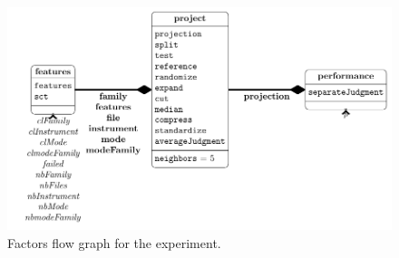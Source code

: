   
 
  
  
\begin{center} 
  
  
\begin{figure} 
  
  
\includegraphics[width=\textwidth,height=0.8\textheight,keepaspectratio]{../figures/factors.pdf} 
  
  
\label{factorFlowGraph} 
  
  
\caption{Factors flow graph for the experiment.} 
  
  
\end{figure} 
  
  
\end{center} 
  
